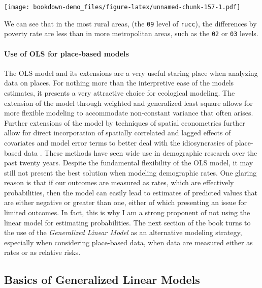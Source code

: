 \documentclass[
]{article}
\begin{document}
\texttt{[image: bookdown-demo\_files/figure-latex/unnamed-chunk-157-1.pdf]}

We can see that in the most rural areas, (the \texttt{09} level of \texttt{rucc}), the differences by poverty rate are less than in more metropolitan areas, such as the \texttt{02} or \texttt{03} levels.

\hypertarget{use-of-ols-for-place-based-models}{%
\paragraph{Use of OLS for place-based models}\label{use-of-ols-for-place-based-models}}

The OLS model and its extensions are a very useful staring place when analyzing data on places. For nothing more than the interpretive ease of the models estimates, it presents a very attractive choice for ecological modeling. The extension of the model through weighted and generalized least square allows for more flexible modeling to accommodate non-constant variance that often arises. Further extensions of the model by techniques of spatial econometrics further allow for direct incorporation of spatially correlated and lagged effects of covariates and model error terms to better deal with the idiosyncrasies of place-based data \citep{chi_spatial_2020, elhorst_spatial_2014, lesage_introduction_2009}. These methods have seen wide use in demographic research over the past twenty years. Despite the fundamental flexibility of the OLS model, it may still not present the best solution when modeling demographic rates. One glaring reason is that if our outcomes are measured as rates, which are effectively probabilities, then the model can easily lead to estimates of predicted values that are either negative or greater than one, either of which presenting an issue for limited outcomes. In fact, this is why I am a strong proponent of not using the linear model for estimating probabilities. The next section of the book turns to the use of the \emph{Generalized Linear Model} \citep{nelder_generalized_1972, mccullagh_generalized_1998} as an alternative modeling strategy, especially when considering place-based data, when data are measured either as rates or as relative risks.

\newpage

\hypertarget{basics-of-generalized-linear-models}{%
\subsection{Basics of Generalized Linear Models}\label{basics-of-generalized-linear-models}}
\end{document}
